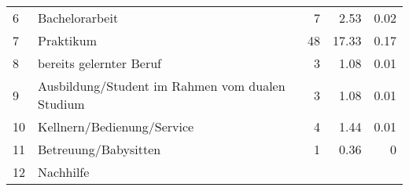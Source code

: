 \begin{longtable}{lXrrr}
     6 &
     \multicolumn{1}{X}{ Bachelorarbeit   } &


       \num{7} &
       \num[round-mode=places,round-precision=2]{2.53} &
         \num[round-mode=places,round-precision=2]{0.02} \\

     7 &
     \multicolumn{1}{X}{ Praktikum   } &


       \num{48} &
       \num[round-mode=places,round-precision=2]{17.33} &
         \num[round-mode=places,round-precision=2]{0.17} \\

     8 &
     \multicolumn{1}{X}{ bereits gelernter Beruf   } &


       \num{3} &
       \num[round-mode=places,round-precision=2]{1.08} &
         \num[round-mode=places,round-precision=2]{0.01} \\

     9 &
     \multicolumn{1}{X}{ Ausbildung/Student im Rahmen vom dualen Studium   } &


       \num{3} &
       \num[round-mode=places,round-precision=2]{1.08} &
         \num[round-mode=places,round-precision=2]{0.01} \\

     10 &
     \multicolumn{1}{X}{ Kellnern/Bedienung/Service   } &


       \num{4} &
       \num[round-mode=places,round-precision=2]{1.44} &
         \num[round-mode=places,round-precision=2]{0.01} \\

     11 &
     \multicolumn{1}{X}{ Betreuung/Babysitten   } &


       \num{1} &
       \num[round-mode=places,round-precision=2]{0.36} &
         \num[round-mode=places,round-precision=2]{0} \\

     12 &
     \multicolumn{1}{X}{ Nachhilfe   } &



\end{longtable}

